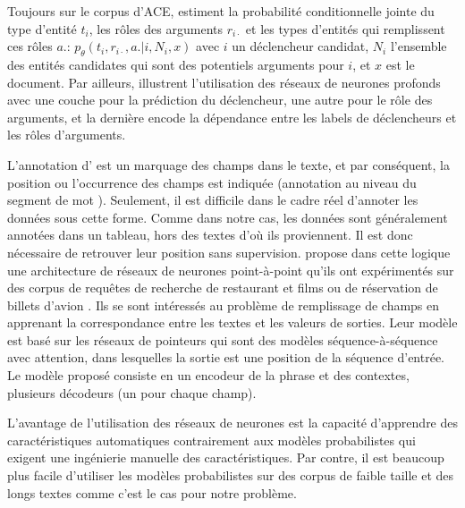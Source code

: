 Toujours sur le corpus d'ACE, \citet{yang2016jointEntityEvt} estiment la probabilité conditionnelle jointe du type d'entité $t_i$, les rôles des arguments $r_{i\cdot}$ et les types d'entités qui remplissent ces rôles $a.$: $p_\theta(t_i,r_{i\cdot},a. \vert i, N_i, x)$ avec $i$ un déclencheur candidat, $N_i$ l'ensemble des entités candidates qui sont des potentiels arguments pour $i$, et $x$ est le document. Par ailleurs, \citet{nguyen2016jointtrgarg} illustrent l'utilisation des réseaux de neurones profonds avec une couche pour la prédiction du déclencheur, une autre pour le rôle des arguments, et la dernière encode la dépendance entre les labels de déclencheurs et les rôles d'arguments. 

L'annotation d'\citet{ace2005event} est un marquage des champs dans le texte, et par conséquent, la position ou l'occurrence des champs est indiquée (\og annotation au niveau du segment de mot \fg{}). Seulement, il est difficile dans le cadre réel d'annoter les données sous cette forme. Comme dans notre cas, les données sont généralement annotées dans un tableau, hors des textes d'où ils proviennent. Il est donc nécessaire de retrouver leur position sans supervision. \citet{palm2017e2e-dnn} propose dans cette logique une architecture de réseaux de neurones point-à-point qu'ils ont expérimentés sur des corpus de requêtes de recherche de restaurant et films \citep{liu2013mitmovierestaurant} ou de réservation de billets d'avion \citep{price1990atis}. Ils se sont intéressés au problème de remplissage de champs en apprenant la correspondance entre les textes et les valeurs de sorties. Leur modèle est basé sur les réseaux de pointeurs \citep{vinyals2015pointernetworks} qui sont des modèles séquence-à-séquence avec attention, dans lesquelles la sortie est une position de la séquence d'entrée. Le modèle proposé consiste en un encodeur de la phrase et des contextes, plusieurs décodeurs (un pour chaque champ). 

L'avantage de l'utilisation des réseaux de neurones est la capacité d'apprendre des caractéristiques automatiques contrairement aux modèles probabilistes qui exigent une ingénierie manuelle des caractéristiques. Par contre, il est beaucoup plus facile d'utiliser les modèles probabilistes sur des corpus de faible taille et des longs textes comme c'est le cas pour notre problème.


